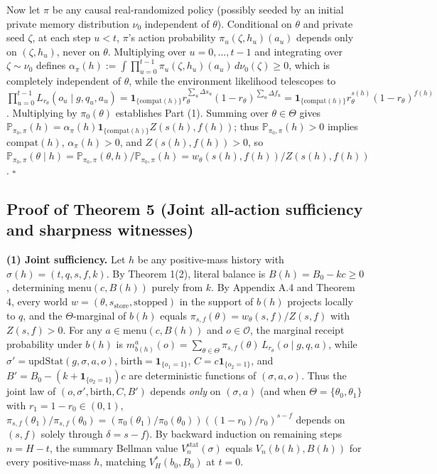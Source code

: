 \documentclass[11pt,letterpaper]{article}
\begin{document}
Now let \(\pi\) be any causal real-randomized policy (possibly seeded by
an initial private memory distribution \(\nu_0\) independent of
\(\theta\)). Conditional on \(\theta\) and private seed \(\zeta\), at
each step \(u < t\), \(\pi\)'s action probability
\(\pi_u(\zeta, h_u)(a_u)\) depends only on \((\zeta, h_u)\), never on
\(\theta\). Multiplying over \(u = 0, \dots, t-1\) and integrating over
\(\zeta \sim \nu_0\) defines
\(\alpha_\pi(h) := \int \prod_{u=0}^{t-1} \pi_u(\zeta, h_u)(a_u)\, d\nu_0(\zeta) \ge 0\),
which is completely independent of \(\theta\), while the environment
likelihood telescopes to
\(\prod_{u=0}^{t-1} L_{r_\theta}(o_u \mid g, q_u, a_u) = \mathbf{1}_{\{\mathrm{compat}(h)\}} r_\theta^{\sum_u \Delta s_u} (1 - r_\theta)^{\sum_u \Delta f_u} = \mathbf{1}_{\{\mathrm{compat}(h)\}} r_\theta^{s(h)} (1 - r_\theta)^{f(h)}\).
Multiplying by \(\pi_0(\theta)\) establishes Part (1). Summing over
\(\theta \in \Theta\) gives
\(\mathbb{P}_{\pi_0, \pi}(h) = \alpha_\pi(h) \mathbf{1}_{\{\mathrm{compat}(h)\}} Z(s(h), f(h))\);
thus \(\mathbb{P}_{\pi_0, \pi}(h) > 0\) implies \(\mathrm{compat}(h)\),
\(\alpha_\pi(h) > 0\), and \(Z(s(h), f(h)) > 0\), so
\(\mathbb{P}_{\pi_0, \pi}(\theta \mid h) = \mathbb{P}_{\pi_0, \pi}(\theta, h) / \mathbb{P}_{\pi_0, \pi}(h) = w_\theta(s(h), f(h)) / Z(s(h), f(h))\).
\(\square\)

\subsection{Proof of Theorem 5 (Joint all-action sufficiency and
sharpness
witnesses)}\label{proof-of-theorem-5-joint-all-action-sufficiency-and-sharpness-witnesses}

\textbf{(1) Joint sufficiency.} Let \(h\) be any positive-mass history
with \(\sigma(h) = (t, q, s, f, k)\). By Theorem 1(2), literal balance
is \(B(h) = B_0 - kc \ge 0\), determining \(\mathrm{menu}(c, B(h))\)
purely from \(k\). By Appendix A.4 and Theorem 4, every world
\(w = (\theta, s_{\mathrm{store}}, \mathrm{stopped})\) in the support of
\(b(h)\) projects locally to \(q\), and the \(\Theta\)-marginal of
\(b(h)\) equals \(\pi_{s,f}(\theta) = w_\theta(s,f)/Z(s,f)\) with
\(Z(s,f) > 0\). For any \(a \in \mathrm{menu}(c, B(h))\) and
\(o \in \mathcal{O}\), the marginal receipt probability under \(b(h)\)
is
\(m_{b(h)}^a(o) = \sum_{\theta \in \Theta} \pi_{s,f}(\theta)\, L_{r_\theta}(o \mid g, q, a)\),
while \(\sigma' = \mathrm{updStat}(g, \sigma, a, o)\),
\(\mathrm{birth} = \mathbf{1}_{\{o_1=1\}}\),
\(C = c\mathbf{1}_{\{o_2=1\}}\), and
\(B' = B_0 - (k + \mathbf{1}_{\{o_2=1\}})c\) are deterministic functions
of \((\sigma, a, o)\). Thus the joint law of
\((o, \sigma', \mathrm{birth}, C, B')\) depends \emph{only} on
\((\sigma, a)\) (and when \(\Theta = \{\theta_0, \theta_1\}\) with
\(r_1 = 1 - r_0 \in (0,1)\),
\(\pi_{s,f}(\theta_1)/\pi_{s,f}(\theta_0) = (\pi_0(\theta_1)/\pi_0(\theta_0))((1-r_0)/r_0)^{s-f}\)
depends on \((s,f)\) solely through \(\delta = s - f\)). By backward
induction on remaining steps \(n = H - t\), the summary Bellman value
\(V_n^{\mathrm{stat}}(\sigma)\) equals \(V_n(b(h), B(h))\) for every
positive-mass \(h\), matching \(V_H^*(b_0, B_0)\) at \(t = 0\).
\end{document}
